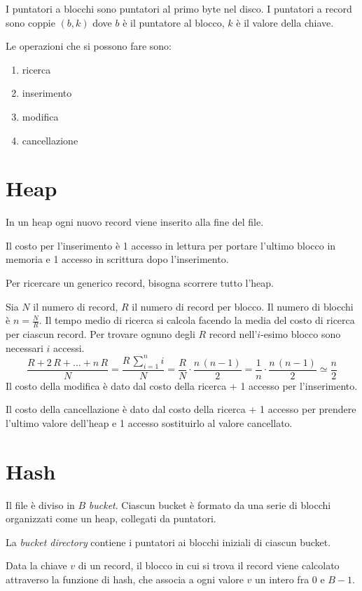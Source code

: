 I puntatori a blocchi sono puntatori al primo byte nel disco. I puntatori a record sono coppie $(b,k)$ dove $b$ \`e il puntatore al blocco, $k$ \`e il valore della chiave.

Le operazioni che si possono fare sono:
\begin{enumerate}
    \item ricerca
    \item inserimento
    \item modifica
    \item cancellazione
\end{enumerate}

\section{Heap}

In un heap ogni nuovo record viene inserito alla fine del file.

Il costo per l'inserimento \`e 1 accesso in lettura per portare l'ultimo blocco in memoria e 1 accesso in scrittura dopo l'inserimento.

Per ricercare un generico record, bisogna scorrere tutto l'heap.

Sia $N$ il numero di record, $R$ il numero di record per blocco. Il numero di blocchi \`e $n = \frac{N}{R}$. Il tempo medio di ricerca si calcola facendo la media del costo di ricerca per ciascun record. Per trovare ognuno degli $R$ record nell'$i$-esimo blocco sono necessari $i$ accessi.
\[
\frac{R + 2 \, R + \ldots + n \, R}{N} = \frac{R \, \sum_{i = 1}^{n} i}{N} = 
\frac{R}{N} \cdot \frac{n \, (n - 1)}{2} = \frac{1}{n} \cdot \frac{n \, (n - 1)}{2} \simeq 
\frac{n}{2}
\]
Il costo della modifica \`e dato dal costo della ricerca + 1 accesso per l'inserimento.

Il costo della cancellazione \`e dato dal costo della ricerca + 1 accesso per prendere l'ultimo valore dell'heap e 1 accesso sostituirlo al valore cancellato.

\section{Hash}

Il file \`e diviso in $B$ \emph{bucket}. Ciascun bucket \`e formato da una serie di blocchi organizzati come un heap, collegati da puntatori.

La \emph{bucket directory} contiene i puntatori ai blocchi iniziali di ciascun bucket.

Data la chiave $v$ di un record, il blocco in cui si trova il record viene calcolato attraverso la funzione di hash, che associa a ogni valore $v$ un intero fra 0 e $B - 1$.

